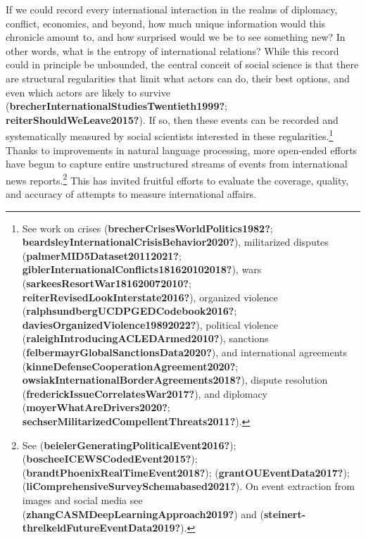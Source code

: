 \documentclass{article}
\begin{document}
If we could record every international interaction in the realms of
diplomacy, conflict, economics, and beyond, how much unique information
would this chronicle amount to, and how surprised would we be to see
something new? In other words, what is the entropy of international
relations? While this record could in principle be unbounded, the
central conceit of social science is that there are structural
regularities that limit what actors can do, their best options, and even
which actors are likely to survive
(\textbf{brecherInternationalStudiesTwentieth1999?};
\textbf{reiterShouldWeLeave2015?}). If so, then these events can be
recorded and systematically measured by social scientists interested in
these regularities.\footnote{See work on crises
  (\textbf{brecherCrisesWorldPolitics1982?};
  \textbf{beardsleyInternationalCrisisBehavior2020?}), militarized
  disputes (\textbf{palmerMID5Dataset20112021?};
  \textbf{giblerInternationalConflicts181620102018?}), wars
  (\textbf{sarkeesResortWar181620072010?};
  \textbf{reiterRevisedLookInterstate2016?}), organized violence
  (\textbf{ralphsundbergUCDPGEDCodebook2016?};
  \textbf{daviesOrganizedViolence19892022?}), political violence
  (\textbf{raleighIntroducingACLEDArmed2010?}), sanctions
  (\textbf{felbermayrGlobalSanctionsData2020?}), and international
  agreements (\textbf{kinneDefenseCooperationAgreement2020?};
  \textbf{owsiakInternationalBorderAgreements2018?}), dispute resolution
  (\textbf{frederickIssueCorrelatesWar2017?}), and diplomacy
  (\textbf{moyerWhatAreDrivers2020?};
  \textbf{sechserMilitarizedCompellentThreats2011?}).} Thanks to
improvements in natural language processing, more open-ended efforts
have begun to capture entire unstructured streams of events from
international news reports.\footnote{See
  (\textbf{beielerGeneratingPoliticalEvent2016?});
  (\textbf{boscheeICEWSCodedEvent2015?});
  (\textbf{brandtPhoenixRealTimeEvent2018?});
  (\textbf{grantOUEventData2017?});
  (\textbf{liComprehensiveSurveySchemabased2021?}). On event extraction
  from images and social media see
  (\textbf{zhangCASMDeepLearningApproach2019?}) and
  (\textbf{steinert-threlkeldFutureEventData2019?}).} This has invited
fruitful efforts to evaluate the coverage, quality, and accuracy of
attempts to measure international affairs.
\end{document}
